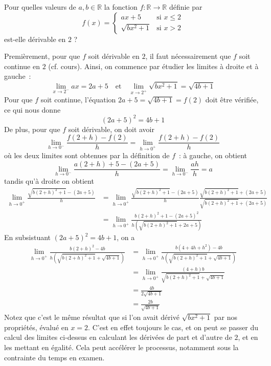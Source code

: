 \begin{exercice}
Pour quelles valeurs de $a, b \in \mathbb{R}$ la fonction $f : \mathbb{R} \to \mathbb{R}$ définie par
\[
f(x) = \begin{cases}
ax + 5 & \textrm{si } x \leq 2 \\
\sqrt{bx^2 + 1} & \textrm{si } x > 2
\end{cases}
\]
est-elle dérivable en $2$ ?

Premièrement, pour que $f$ soit dérivable en $2$, il faut nécessairement que $f$ soit continue en $2$ (cf. cours). Ainsi, on commence par étudier les limites à droite et à gauche~:
\[
\lim_{x \to 2^-} ax = 2a + 5 \quad \textrm{et} \quad \lim_{x \to 2^+} \sqrt{bx^2 + 1} = \sqrt{4b + 1}
\]
Pour que $f$ soit continue, l'équation $2a + 5 = \sqrt{4b + 1} = f(2)$ doit être vérifiée, ce qui nous donne
\[
(2a + 5)^2 = 4b + 1
\]
De plus, pour que $f$ soit dérivable, on doit avoir
\[
\lim_{h \to 0^-} \frac{f(2+h)-f(2)}{h} = \lim_{h \to 0^+} \frac{f(2+h)-f(2)}{h}
\]
où les deux limites sont obtenues par la définition de $f$~: à gauche, on obtient
\[
\lim_{h \to 0^-} \frac{a(2 + h) + 5 - (2a + 5)}{h} = \lim_{h \to 0^-} \frac{ah}{h} = a
\]
tandis qu'à droite on obtient
\begin{align*}
\lim_{h \to 0^+} \frac{\sqrt{b(2 + h)^2 + 1} - (2a + 5)}{h} & = \lim_{h \to 0^+} \frac{\sqrt{b(2 + h)^2 + 1} - (2a + 5)}{h} \frac{\sqrt{b(2 + h)^2 + 1} + (2a + 5)}{\sqrt{b(2 + h)^2 + 1} + (2a + 5)} \\
& = \lim_{h \to 0^+} \frac{b(2+h)^2 + 1 - (2a + 5)^2}{h (\sqrt{b(2 + h)^2 + 1} + 2a + 5)}
\end{align*}
En subsistuant $(2a + 5)^2 = 4b + 1$, on a
\begin{align*}
\lim_{h \to 0^+} \frac{b(2+h)^2 - 4b}{h (\sqrt{b(2 + h)^2 + 1} + \sqrt{4b + 1})} & = \lim_{h \to 0^+} \frac{b(4 + 4h + h^2) - 4b}{h (\sqrt{b(2 + h)^2 + 1} + \sqrt{4b + 1})} \\
& = \lim_{h \to 0^+} \frac{(4 + h)b}{\sqrt{b(2 + h)^2 + 1} + \sqrt{4b + 1}} \\
& = \frac{4b}{2\sqrt{4b + 1}} \\
& = \frac{2b}{\sqrt{4b + 1}}
\end{align*}
Notez que c'est le même résultat que si l'on avait dérivé $\sqrt{bx^2 + 1}$ par nos propriétés, évalué en $x = 2$. C'est en effet toujours le cas, et on peut se passer du calcul des limites ci-dessus en calculant les dérivées de part et d'autre de $2$, et en les mettant en égalité.
Cela peut accélérer le processus, notamment sous la contrainte du temps en examen.


\end{exercice}
